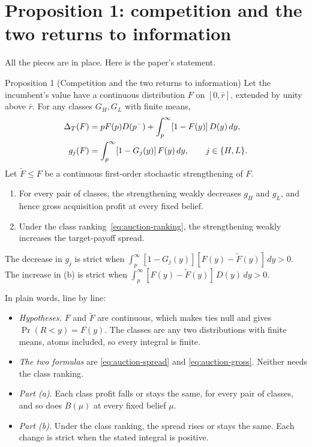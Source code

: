 \section{Proposition 1: competition and the two returns to information}\label{sec:auction-prop1}

All the pieces are in place. Here is the paper's statement.

\begin{paperresult}{Proposition 1 (Competition and the two returns to information)}
Let the incumbent's value have a continuous distribution \(F\) on \([0,\bar r]\), extended by unity above
\(\bar r\). For any classes \(G_H,G_L\) with finite means,
\[
\begin{aligned}
\Delta_T(F)&=pF(p)D(p^-)+\int_p^\infty[1-F(y)]\,D(y)\,dy,\\
g_j(F)&=\int_p^\infty[1-G_j(y)]\,F(y)\,dy,\qquad j\in\{H,L\}.
\end{aligned}
\]
Let \(\tilde F\le F\) be a continuous first-order stochastic strengthening of \(F\).
\begin{enumerate}[label=(\alph*),leftmargin=2em]
\item For every pair of classes, the strengthening weakly decreases \(g_H\) and \(g_L\), and hence gross
acquisition profit at every fixed belief.
\item Under the class ranking~\eqref{eq:auction-ranking}, the strengthening weakly increases the target-payoff
spread.
\end{enumerate}
The decrease in \(g_j\) is strict when \(\int_p^\infty[1-G_j(y)][F(y)-\tilde F(y)]\,dy>0\). The increase in (b) is
strict when \(\int_p^\infty[F(y)-\tilde F(y)]\,D(y)\,dy>0\).
\end{paperresult}

In plain words, line by line:
\begin{itemize}
\item \emph{Hypotheses.} \(F\) and \(\tilde F\) are continuous, which makes ties null and gives
\(\Pr(R<y)=F(y)\). The classes are any two distributions with finite means, atoms included, so every integral is
finite.
\item \emph{The two formulas} are \eqref{eq:auction-spread} and \eqref{eq:auction-gross}. Neither needs the class
ranking.
\item \emph{Part (a).} Each class profit falls or stays the same, for every pair of classes, and so does
\(B(\mu)\) at every fixed belief \(\mu\).
\item \emph{Part (b).} Under the class ranking, the spread rises or stays the same. Each change is strict when the
stated integral is positive.
\end{itemize}

